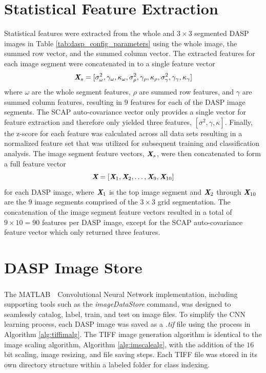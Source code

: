 \section[Statistical Feature Extraction]{Statistical Feature Extraction}

Statistical features were extracted from the whole and $3 \times 3$ segmented DASP images in Table \ref{tab:dasp_config_parameters} using the whole image, the summed row vector, and the summed column vector.  The extracted features for each image segment were concatenated in to a single feature vector 
\begin{equation}
	\textit{\textbf{X}}_s= [\sigma^{2}_{\omega},  \gamma_{\omega},  \kappa_{\omega}, \sigma^{2}_{\rho},  \gamma_{\rho},  \kappa_{\rho}, \sigma^{2}_{\gamma},  \gamma_{\gamma},  \kappa_{\gamma}]
	\label{eq:featureeq}
\end{equation}
where $\omega$ are the whole segment features, $\rho$ are summed row features, and $\gamma$ are summed column features, resulting in $9$ features for each of the DASP image segments.  The SCAP auto-covariance vector only provides a single vector for feature extraction and therefore only yielded three features, $[\sigma^{2},  \gamma,  \kappa]$.  Finally, the z-score for each feature was calculated across all data sets resulting in a normalized feature set that was utilized for subsequent training and classification analysis.  The image segment feature vectors, $\textit{\textbf{X}}_s$, were then concatenated to form a full feature vector
\begin{equation}
	\textit{\textbf{X}}= [\textit{\textbf{X}}_1, \textit{\textbf{X}}_2, \ldots, \textit{\textbf{X}}_9, \textit{\textbf{X}}_{10}]
	\label{eq:featureeq_cat}
\end{equation}
for each DASP image, where $\textit{\textbf{X}}_1$ is the top image segment and $\textit{\textbf{X}}_2$ through $\textit{\textbf{X}}_{10}$ are the $9$ image segments comprised of the $3 \times 3$ grid segmentation.  The concatenation of the image segment feature vectors resulted in a total of $9 \times 10 = 90$ features per DASP image, except for the SCAP auto-covariance feature vector which only returned three features.

\section[DASP Image Store]{DASP Image Store}

The MATLAB\textsuperscript \textregistered ~~Convolutional Neural Network implementation, including supporting tools such as the \textit{imageDataStore} command, was designed to seamlessly catalog, label, train, and test on image files.  To simplify the CNN learning process, each DASP image was saved as a \textit{.tif} file using the process in Algorithm \ref{alg:tiffimalg}.  The TIFF image generation algorithm is identical to the image scaling algorithm, Algorithm \ref{alg:imscalealg}, with the addition of the $16$bit scaling, image resizing, and file saving steps.  Each TIFF file was stored in its own directory structure within a labeled folder for class indexing.

